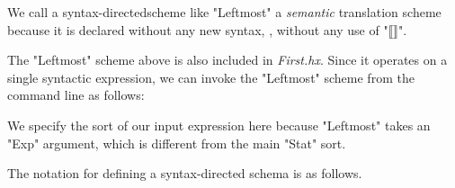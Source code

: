 \documentclass[11pt]{article} %
\begin{document}
We call a syntax-directedscheme like "Leftmost" a \emph{semantic} translation scheme because it is
declared without any new syntax, \ie, without any use of "⟦⟧".

\begin{commands}
  The "Leftmost" scheme above is also included in \emph{First.hx}.  Since it operates on a single
  syntactic expression, we can invoke the "Leftmost" scheme from the command line as follows:
  We specify the sort of our input expression here because "Leftmost" takes an "Exp" argument, which
  is different from the main "Stat" sort.
\end{commands}

The notation for defining a syntax-directed schema is as follows.
\end{document}
